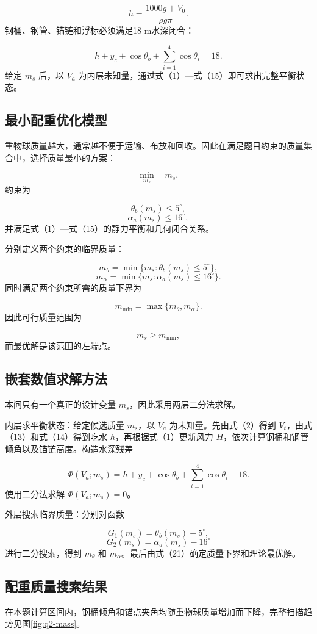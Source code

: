 \documentclass[UTF8,zihao=-4,a4paper,fontset=fandol]{ctexart}
\begin{document}
\[
h=\frac{1000g+V_0}{\rho g\pi}. \tag{14}
\]
钢桶、钢管、锚链和浮标必须满足18 m水深闭合：

\[
h+y_c+\cos\theta_b+
\sum_{i=1}^{4}\cos\theta_i=18. \tag{15}
\]
给定 \(m_s\) 后，以 \(V_a\) 为内层未知量，通过式（1）—式（15）即可求出完整平衡状态。

\subsection{最小配重优化模型}
重物球质量越大，通常越不便于运输、布放和回收。因此在满足题目约束的质量集合中，选择质量最小的方案：

\[
\min_{m_s}\quad m_s, \tag{16}
\]
约束为

\[
\theta_b(m_s)\le5^\circ, \tag{17}
\]
\[
\alpha_a(m_s)\le16^\circ, \tag{18}
\]
并满足式（1）—式（15）的静力平衡和几何闭合关系。

分别定义两个约束的临界质量：

\[
m_\theta=\min\{m_s:\theta_b(m_s)\le5^\circ\}, \tag{19}
\]
\[
m_\alpha=\min\{m_s:\alpha_a(m_s)\le16^\circ\}. \tag{20}
\]
同时满足两个约束所需的质量下界为

\[
m_{\min}=\max\{m_\theta,m_\alpha\}. \tag{21}
\]
因此可行质量范围为

\[
m_s\ge m_{\min}, \tag{22}
\]
而最优解是该范围的左端点。

\subsection{嵌套数值求解方法}
本问只有一个真正的设计变量 \(m_s\)，因此采用两层二分法求解。

内层求平衡状态：给定候选质量 \(m_s\)，以 \(V_a\) 为未知量。先由式（2）得到 \(V_t\)，由式（13）和式（14）得到吃水 \(h\)，再根据式（1）更新风力 \(H\)，依次计算钢桶和钢管倾角以及锚链高度。构造水深残差

\[
\Phi(V_a;m_s)=h+y_c+\cos\theta_b+
\sum_{i=1}^{4}\cos\theta_i-18. \tag{23}
\]
使用二分法求解 \(\Phi(V_a;m_s)=0\)。

外层搜索临界质量：分别对函数

\[
G_1(m_s)=\theta_b(m_s)-5^\circ,
\]
\[
G_2(m_s)=\alpha_a(m_s)-16^\circ
\]
进行二分搜索，得到 \(m_\theta\) 和 \(m_\alpha\)。最后由式（21）确定质量下界和理论最优解。

\subsection{配重质量搜索结果}
在本题计算区间内，钢桶倾角和锚点夹角均随重物球质量增加而下降，完整扫描趋势见图\ref{fig:q2-mass}。
\end{document}
